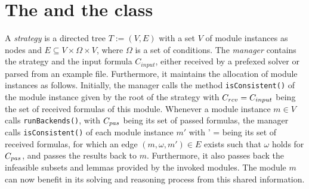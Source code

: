 \section{The \managerClass and the \strategyClass class} A
\emph{strategy} is a directed tree $T:=(V, E)$ with a set $V$ of
module instances as nodes and $E\subseteq V\times \Omega\times V$,
where $\Omega$ is a set of conditions. The \emph{manager} contains the
strategy and the input formula $C_{input}$, either received by a prefexed solver
or parsed from an example file. Furthermore, it maintains the
allocation of module instances as follows. Initially, the manager calls the method
\texttt{isConsistent()} of the module instance given by the root of
the strategy with $C_{rcv} = C_{input}$ being the set of received formulas of this
module. Whenever a module instance $m\in V$ calls
\texttt{runBackends()}, with $C_{pas}$ being its set of passed
formulas, the manager calls \texttt{isConsistent()} of each module instance
$m'$ with \Crcv' = \Cpass being its set of received formulas, for which
an edge $(m, \omega, m')\in E$ exists such that $\omega$ holds for
$C_{pas}$, and passes the results back to $m$. Furthermore, it also
passes back the infeasible subsets and lemmas provided by the invoked
modules. The module $m$ can now benefit in its solving and reasoning
process from this shared information.

